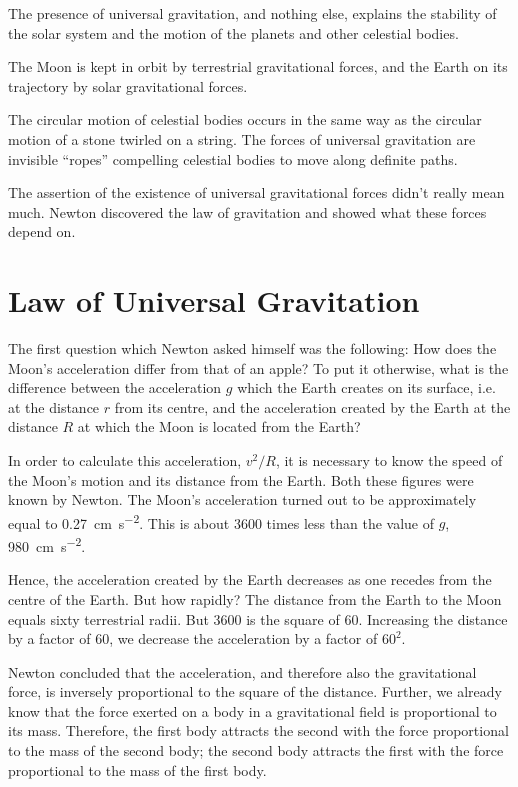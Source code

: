 The presence of universal gravitation, and nothing else,
explains the stability of the solar system and the motion
of the planets and other celestial bodies.

The Moon is kept in orbit by terrestrial gravitational
forces, and the Earth on its trajectory by solar gravitational forces.

The circular motion of celestial bodies occurs in the
same way as the circular motion of a stone twirled on
a string. The forces of universal gravitation are invisible
``ropes'' compelling celestial bodies to move along definite
paths.

The assertion of the existence of universal gravitational
forces didn't really mean much. Newton discovered the
law of gravitation and showed what these forces depend
on.

\section{Law of Universal Gravitation}
The first question which Newton asked himself was the
following: How does the Moon's acceleration differ from
that of an apple? To put it otherwise, what is the difference between the acceleration $g$ which the Earth creates
on its surface, i.e. at the distance $r$ from its centre, and
the acceleration created by the Earth at the distance $R$
at which the Moon is located from the Earth?

In order to calculate this acceleration, $v^{2}/R$, it is necessary to know the speed of the Moon's motion and its
distance from the Earth. Both these figures were known
by Newton. The Moon's acceleration turned out to be
approximately equal to \SI{0.27}{\centi\meter\per\second\squared}. This is about 3600
times less than the value of $g$,  \SI{980}{\centi\meter\per\second\squared}.

Hence, the acceleration created by the Earth decreases
as one recedes from the centre of the Earth. But how rapidly? The distance from the Earth to the Moon equals
sixty terrestrial radii. But 3600 is the square of 60. Increasing the distance by a factor of 60, we decrease the
acceleration by a factor of $60^{2}$.

Newton concluded that the acceleration, and therefore
also the gravitational force, is inversely proportional to
the square of the distance. Further, we already know that
the force exerted on a body in a gravitational field is proportional to its mass. Therefore, the first body attracts
the second with the force proportional to the mass of the
second body; the second body attracts the first with the
force proportional to the mass of the first body.

